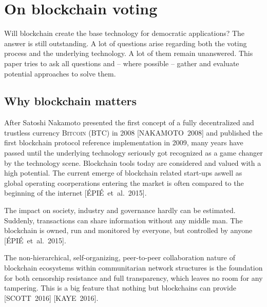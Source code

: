 
\section{On blockchain voting}
Will blockchain create the base technology for democratic applications? The answer is still outstanding. A lot of questions arise regarding both the voting process and the underlying technology. A lot of them remain unanswered. This paper tries to ask all questions and -- where possible -- gather and evaluate potential approaches to solve them.

\subsection{Why blockchain matters}
After Satoshi Nakamoto presented the first concept of a fully decentralized and trustless currency \textsc{Bitcoin (BTC)} in 2008 [NAKAMOTO~2008] and published the first blockchain protocol reference implementation in 2009, many years have passed until the underlying technology seriously got recognized as a game changer by the technology scene. Blockchain tools today are considered and valued with a high potential. The current emerge of blockchain related start-ups aswell as global operating coorperations entering the market is often compared to the beginning of the internet [ÉPIÉ~et~al.~2015].\par
The impact on society, industry and governance hardly can be estimated. Suddenly, transactions can share information without any middle man. The blockchain is owned, run  and monitored by everyone, but controlled by anyone [ÉPIÉ~et~al.~2015].\par
The non-hierarchical, self-organizing, peer-to-peer collaboration nature of blockchain ecosystems within communitarian network structures is the foundation for both censorship resistance and full transparency, which leaves no room for any tampering. This is a big feature that nothing but blockchains can provide [SCOTT~2016] [KAYE~2016].

